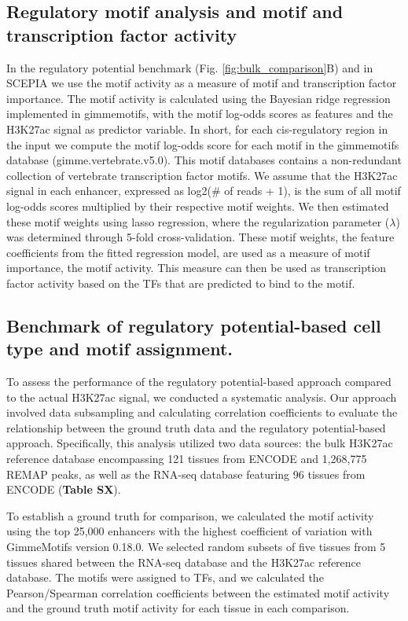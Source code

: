 \subsection{Regulatory motif analysis and motif and transcription factor activity}

In the regulatory potential benchmark (Fig. \ref{fig:bulk_comparison}B) and in SCEPIA we use the motif activity as a measure of motif and transcription factor importance. The motif activity\cite{FANTOM2009, Balwierz2014} is calculated using the Bayesian ridge regression implemented in gimmemotifs\cite{Bruse_2018}, with the motif log-odds scores as features and the H3K27ac signal as predictor variable. In short, for each cis-regulatory region in the input we compute the motif log-odds score for each motif in the gimmemotifs database (gimme.vertebrate.v5.0). This motif databases contains a non-redundant collection of vertebrate transcription factor motifs\cite{Bruse_2018}. We assume that the H3K27ac signal in each enhancer, expressed as log2(\# of reads + 1), is the sum of all motif log-odds scores multiplied by their respective motif weights. We then estimated these motif weights using lasso regression, where the regularization parameter ($\lambda$) was determined through 5-fold cross-validation. These motif weights, the feature coefficients from the fitted regression model, are used as a measure of motif importance, the motif activity. This measure can then be used as transcription factor activity based on the TFs that are predicted to bind to the motif.

\subsection{Benchmark of regulatory potential-based cell type and motif assignment.}

To assess the performance of the regulatory potential-based approach compared to the actual H3K27ac signal, we conducted a systematic analysis. Our approach involved data subsampling and calculating correlation coefficients to evaluate the relationship between the ground truth data and the regulatory potential-based approach. Specifically, this analysis utilized two data sources: the bulk H3K27ac reference database encompassing 121 tissues from ENCODE and 1,268,775 REMAP peaks, as well as the RNA-seq database featuring 96 tissues from ENCODE (\textbf{Table SX}).

To establish a ground truth for comparison, we calculated the motif activity using the top 25,000 enhancers with the highest coefficient of variation with GimmeMotifs version 0.18.0\cite{Bruse_2018}. We selected random subsets of five tissues from 5 tissues shared between the RNA-seq database and the H3K27ac reference database. The motifs were assigned to TFs, and we calculated the Pearson/Spearman correlation coefficients between the estimated motif activity and the ground truth motif activity for each tissue in each comparison.

